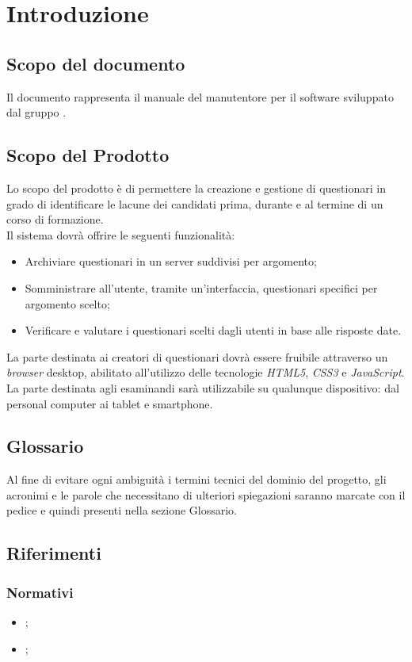 \newpage
\section{Introduzione}
\subsection{Scopo del documento}
Il documento rappresenta il manuale del manutentore per il software \progetto{} sviluppato dal gruppo \gruppo.
\subsection{Scopo del Prodotto}
Lo scopo del prodotto è di permettere la creazione e gestione di questionari in grado di identificare le lacune dei candidati prima, durante e al termine di un corso di formazione. 
\\Il sistema dovrà offrire le seguenti funzionalità:
\begin{itemize}
	\item
	Archiviare questionari in un server suddivisi per argomento;
	\item
	Somministrare all'utente, tramite un'interfaccia, questionari specifici per argomento scelto;
	\item
	Verificare e valutare i questionari scelti dagli utenti in base alle risposte date.
\end{itemize}
La parte destinata ai creatori di questionari dovrà essere fruibile attraverso un \textit{browser} desktop, abilitato all'utilizzo delle tecnologie \textit{HTML5}, \textit{CSS3} e \textit{JavaScript}. La parte destinata agli esaminandi sarà utilizzabile su qualunque dispositivo: dal personal computer ai tablet e smartphone.
\subsection{Glossario}
Al fine di evitare ogni ambiguità i termini tecnici del dominio del progetto, gli acronimi e le parole che necessitano di ulteriori spiegazioni saranno marcate con il pedice  e quindi presenti nella sezione Glossario.
\subsection{Riferimenti}
\subsubsection{Normativi}
\begin{itemize}
	\item \textit{\NdPv};
	\item \textit{\AdRvDue};
\end{itemize}
